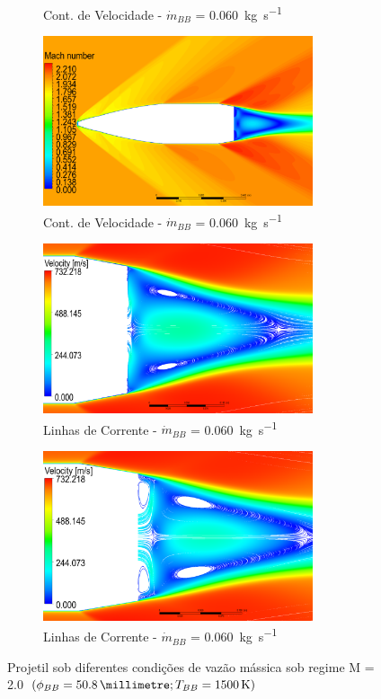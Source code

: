 \begin{figure}[!ht]
\begin{subfigure}[b]{0.47\textwidth}
        \caption{Cont. de Velocidade - \(\Dot{m}_{BB}\) = \qty{0,060}{\kilogram\per\second}}
        \label{fig:contorno-velocidade-bb-1500K-vazao0030}
    \end{subfigure}
    \hfill
	\begin{subfigure}[b]{0.47\textwidth}
        \centering
        \includegraphics[width=\textwidth,height=5cm]{contorno-velocidade-1500K-vazao-0060-2pol.png}
        \caption{Cont. de Velocidade - \(\Dot{m}_{BB}\) = \qty{0,060}{\kilogram\per\second}}
        \label{fig:contorno-velocidade-bb-1500K-vazao0060}
    \end{subfigure}
    \begin{subfigure}[b]{0.47\textwidth}
        \centering
        \includegraphics[width=\textwidth,height=5cm]{corrente-velocidade-1500K-vazao-0030-2pol.png}
        \caption{Linhas de Corrente - \(\Dot{m}_{BB}\) = \qty{0,060}{\kilogram\per\second}}
        \label{fig:corrente-velocidade-bb-1500K-vazao0030}
    \end{subfigure}
    \hfill
	\begin{subfigure}[b]{0.47\textwidth}
        \centering
        \includegraphics[width=\textwidth,height=5cm]{corrente-velocidade-1500K-vazao-0060-2pol.png}
        \caption{Linhas de Corrente - \(\Dot{m}_{BB}\) = \qty{0,060}{\kilogram\per\second}}
        \label{fig:corrente-velocidade-bb-1500K-vazao0060}
    \end{subfigure}
    \caption{Projetil sob diferentes condições de vazão mássica sob regime M = \num{2,0} \(\left(\phi_{BB} = \qty{50,8}{\millimetre}; T_{BB} = \qty{1500}{\kelvin}\right)\)}
	\label{fig:influencia-temperatura-bb}
\end{figure}

